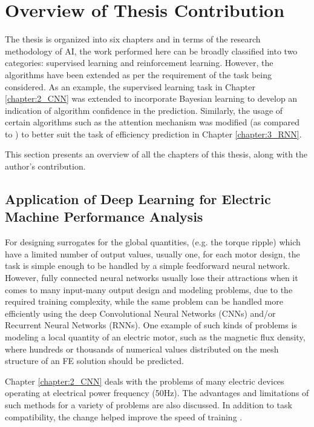 \section{Overview of Thesis Contribution}

The thesis is organized into six chapters and in terms of the research methodology of AI, the work performed here can be broadly classified into two categories: supervised learning and reinforcement learning. However, the algorithms have been extended as per the requirement of the task being considered. As an example, the supervised learning task in Chapter \ref{chapter:2_CNN} was extended to incorporate Bayesian learning to develop an indication of algorithm confidence in the prediction. Similarly, the usage of certain algorithms such as the attention mechanism was modified (as compared to \parencite{bahdanau2014neural}) to better suit the task of efficiency prediction in Chapter \ref{chapter:3_RNN}. 

\newpage

This section presents an overview of all the chapters of this thesis, along with the author's contribution.

\subsection{Application of Deep Learning for Electric Machine Performance Analysis}

For designing surrogates for the global quantities, (e.g. the torque ripple) which have a limited number of output values, usually one, for each motor design, the task is simple enough to be handled by a simple feedforward neural network. However, fully connected neural networks usually lose their attractions when it comes to many input-many output design and modeling problems, due to the required training complexity, while the same problem can be handled more efficiently using the deep Convolutional Neural Networks (CNNs) and/or Recurrent Neural Networks (RNNs). One example of such kinds of problems is modeling a local quantity of an electric motor, such as the magnetic flux density, where hundreds or thousands of numerical values distributed on the mesh structure of an FE solution should be predicted. 

Chapter \ref{chapter:2_CNN} deals with the problems of many electric devices operating at electrical power frequency (50Hz).  
The advantages and limitations of such methods for a variety of problems are also discussed. In addition to task compatibility, the change helped improve the speed of training \parencite{khan2019deep}.

